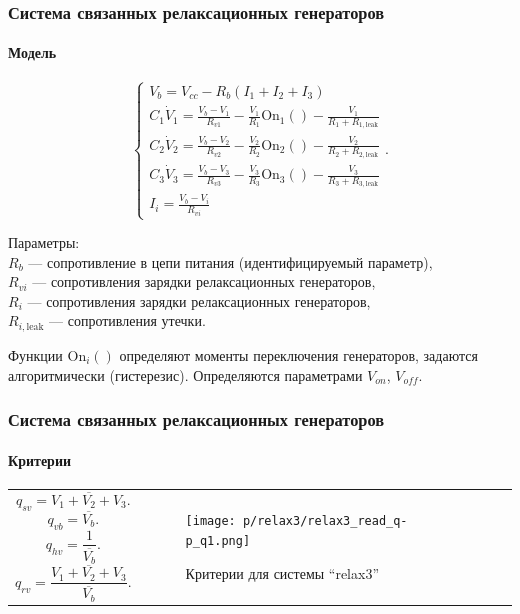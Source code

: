 \documentclass[10pt,utf8]{beamer}
\newlength\TW
\begin{document}
\begin{frame}
  \frametitle{Система связанных релаксационных генераторов}
  \framesubtitle{Модель}

  \begin{equation}
    \begin{cases}
      V_b = V_{cc} - R_b ( I_1 + I_2 + I_3 ) \\
      C_1 \dot{V}_1 = \frac{V_b-V_1}{R_{v1}} - \frac{V_1}{R_1} \mathrm{On}_1() - \frac{V_1}{R_1+R_{1,\mathrm{leak}}} \\
      C_2 \dot{V}_2 = \frac{V_b-V_2}{R_{v2}} - \frac{V_2}{R_2} \mathrm{On}_2() - \frac{V_2}{R_2+R_{2,\mathrm{leak}}} \\
      C_3 \dot{V}_3 = \frac{V_b-V_3}{R_{v3}} - \frac{V_3}{R_3} \mathrm{On}_3() - \frac{V_3}{R_3+R_{3,\mathrm{leak}}} \\
      I_i = \frac{V_b-V_i}{R_{vi}}
    \end{cases}.
    \label{atu:eq:relax3}
  \end{equation}

  Параметры: \\
  $R_b$ --- сопротивление в цепи питания (идентифицируемый параметр), \\
  $R_{vi}$ --- сопротивления зарядки релаксационных генераторов, \\
  $R_{i}$ --- сопротивления зарядки релаксационных генераторов, \\
  $R_{i,\mathrm{leak}}$ --- сопротивления утечки.

  \smallskip

  Функции $ \mathrm{On}_i() $ определяют моменты переключения генераторов,
  задаются алгоритмически (гистерезис). Определяются параметрами
  $V_{on}$, $V_{off}$.


\end{frame}




\begin{frame}
  \frametitle{Система связанных релаксационных генераторов}
  \framesubtitle{Критерии}

  \begin{tabular}{p{40\TW}|p{57\TW}}
    \[
      q_{sv} = \overline{V_1+V_2+V_3} .
    \]
    \[
      q_{vb} = \overline{V_b} .
    \]
    \[
      q_{hv} = \frac{1}{\overline{V_b}} .
    \]
    \[
      q_{rv} = \frac{\overline{V_1+V_2+V_3}}{\overline{V_b}}.
    \]
 &
  \begin{figure}[htb!]
    \centerline{\texttt{[image: p/relax3/relax3\_read\_q-p\_q1.png]} }
    \caption{Критерии для системы ``relax3''}
    \label{atu:f:relax3_q}
  \end{figure}
  \end{tabular}

\end{frame}
\end{document}
